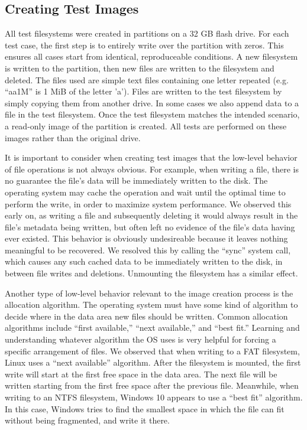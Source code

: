 \subsection{Creating Test Images}
All test filesystems were created in partitions on a 32 GB flash drive. For each test case, the first step is to entirely write over the partition with zeros. This ensures all cases start from identical, reproduceable conditions. A new filesystem is written to the partition, then new files are written to the filesystem and deleted. The files used are simple text files containing one letter repeated (e.g. ``aa1M'' is 1 MiB of the letter 'a'). Files are written to the test filesystem by simply copying them from another drive. In some cases we also append data to a file in the test filesystem. Once the test filesystem matches the intended scenario, a read-only image of the partition is created. All tests are performed on these images rather than the original drive.

It is important to consider when creating test images that the low-level behavior of file operations is not always obvious. For example, when writing a file, there is no guarantee the file's data will be immediately written to the disk. The operating system may cache the operation and wait until the optimal time to perform the write, in order to maximize system performance. We observed this early on, as writing a file and subsequently deleting it would always result in the file's metadata being written, but often left no evidence of the file's data having ever existed. This behavior is obviously undesireable because it leaves nothing meaningful to be recovered. We resolved this by calling the ``sync'' system call, which causes any such cached data to be immediately written to the disk, in between file writes and deletions. Unmounting the filesystem has a similar effect.

Another type of low-level behavior relevant to the image creation process is the allocation algorithm. The operating system must have some kind of algorithm to decide where in the data area new files should be written. Common allocation algorithms include ``first available,'' ``next available,'' and ``best fit.'' %
Learning and understanding whatever algorithm the OS uses is very helpful for forcing a specific arrangement of files. We observed that when writing to a FAT filesystem, Linux uses a ``next available'' algorithm. After the filesystem is mounted, the first write will start at the first free space in the data area. The next file will be written starting from the first free space after the previous file.
Meanwhile, when writing to an NTFS filesystem, Windows 10 appears to use a ``best fit'' algorithm. In this case, Windows tries to find the smallest space in which the file can fit without being fragmented, and write it there.

